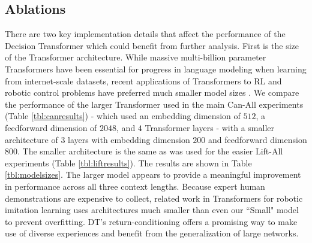 \subsection{Ablations}
There are two key implementation details that affect the performance of the Decision Transformer which could benefit from further analysis. First is the size of the Transformer architecture. While massive multi-billion parameter Transformers have been essential for progress in language modeling \cite{brown2020language} when learning from internet-scale datasets, recent applications of Transformers to RL and robotic control problems have preferred much smaller model sizes \cite{shafiullah2022behavior, decisiontransformer, cui2022play}. We compare the performance of the larger Transformer used in the main Can-All experiments (Table \ref{tbl:canresults}) - which used an embedding dimension of $512$, a feedforward dimension of $2048$, and $4$ Transformer layers - with a smaller architecture of $3$ layers with embedding dimension $200$ and feedforward dimension $800$. The smaller architecture is the same as was used for the easier Lift-All experiments (Table \ref{tbl:liftresults}). The results are shown in Table \ref{tbl:modelsizes}. The larger model appears to provide a meaningful improvement in performance across all three context lengths. Because expert human demonstrations are expensive to collect, related work in Transformers for robotic imitation learning uses architectures much smaller than even our ``Small" model to prevent overfitting. DT's return-conditioning offers a promising way to make use of diverse experiences and benefit from the generalization of large networks.

